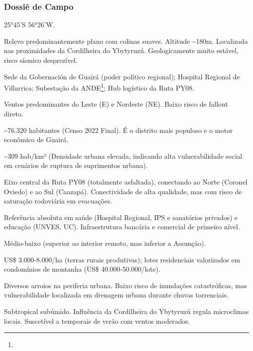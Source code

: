 \subsubsection{Dossiê de Campo}
\begin{description}[style=nextline,leftmargin=0.5cm,font=\bfseries]
\item[Coordenadas]  25°45'S 56°26'W.
\item[Topografia]  Relevo predominantemente plano com colinas suaves. Altitude \textasciitilde 180m. Localizada nas proximidades da Cordilheira do Ybytyruzú. Geologicamente muito estável, risco sísmico desprezível.
\item[Alvos Estratégicos]  Sede da Gobernación de Guairá (poder político regional); Hospital Regional de Villarrica; Subestação da ANDE\footnote{\fineANDE}; Hub logístico da Ruta PY08.
\item[Fallout]  Ventos predominantes do Leste (E) e Nordeste (NE). Baixo risco de fallout direto.
\item[População]  \textasciitilde 76.320 habitantes (Censo 2022 Final). É o distrito mais populoso e o motor econômico de Guairá.
\item[Densidade]  \textasciitilde 309 hab/\allowbreak km² (Densidade urbana elevada, indicando alta vulnerabilidade social em cenários de ruptura de suprimentos urbana).
\item[Vias de Acesso]  Eixo central da Ruta PY08 (totalmente asfaltada), conectando ao Norte (Coronel Oviedo) e ao Sul (Caazapá). Conectividade de alta qualidade, mas com risco de saturação rodoviária em evacuações.
\item[Serviços]  Referência absoluta em saúde (Hospital Regional, IPS e sanatórios privados) e educação (UNVES, UC). Infraestrutura bancária e comercial de primeiro nível.
\item[Custo de Vida]  Médio-baixo (superior ao interior remoto, mas inferior a Assunção).
\item[Preço da Terra]  US\$ 3.000-8.000/\allowbreak ha (terras rurais produtivas); lotes residenciais valorizados em condomínios de montanha (US\$ 40.000-50.000/\allowbreak lote).
\item[Hidrologia]  Diversos arroios na periferia urbana. Baixo risco de inundações catastróficas, mas vulnerabilidade localizada em drenagem urbana durante chuvas torrenciais.
\item[Clima]  Subtropical subúmido. Influência da Cordilheira do Ybytyruzú regula microclimas locais. Suscetível a temporais de verão com ventos moderados.

\end{description}
